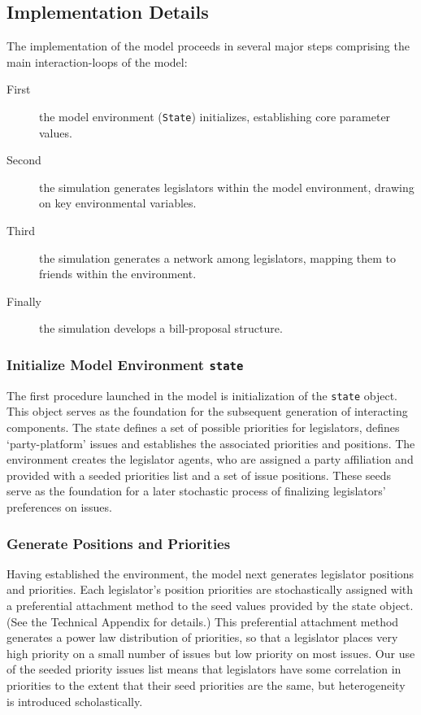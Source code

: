 \documentclass[pdftex,12pt]{llncs}
\begin{document}
\subsection{Implementation Details} 
The implementation of the model proceeds in several major steps comprising the main interaction-loops of the model:  

\begin{description}
  \item[First] the model environment (\texttt{State}) initializes, establishing core parameter values.
  \item[Second] the simulation generates legislators within the model environment, drawing on key environmental variables. 
  \item[Third] the simulation generates a network among legislators, mapping them to friends within the environment.
  \item[Finally] the simulation develops a bill-proposal structure.
\end{description}


\subsubsection{Initialize Model Environment \texttt{state}}
The first procedure launched in the model is initialization of the \texttt{state} object. 
This object serves as the foundation for the subsequent generation of interacting components. 
The state defines a set of possible priorities for legislators, defines `party-platform' issues and establishes the associated priorities and positions. 
The environment creates the legislator agents, who are assigned a party affiliation and provided with a seeded priorities list and a set of issue positions. 
These seeds serve as the foundation for a later stochastic process of finalizing legislators' preferences on issues.  

\subsubsection{Generate Positions and Priorities}
Having established the environment, the model next generates legislator positions and priorities. 
Each legislator's position priorities are stochastically assigned with a preferential attachment method to the seed values provided by the state object. (See the Technical Appendix for details.)  
This preferential attachment method generates a power law distribution of priorities, so that a legislator places very high priority on a small number of issues but low priority on most issues.  
Our use of the seeded priority issues list means that legislators have some correlation in priorities to the extent that their seed priorities are the same, but heterogeneity is introduced scholastically.
\end{document}
